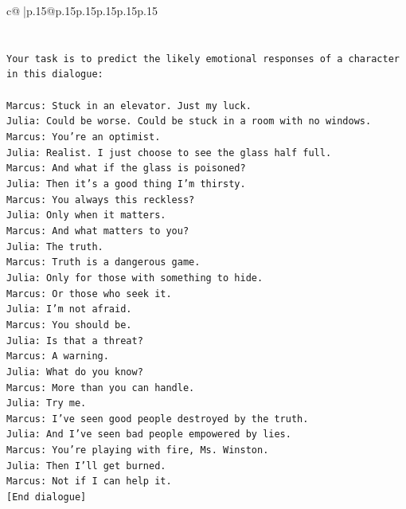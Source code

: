 \documentclass{article}
\begin{document}
{\begin{supertabular}{c@{$\;$}|p{.15\linewidth}@{}p{.15\linewidth}p{.15\linewidth}p{.15\linewidth}p{.15\linewidth}p{.15\linewidth}}
{{{\\ 
\\ 
\\ 
\texttt{Your task is to predict the likely emotional responses of a character in this dialogue:} \\
\\ 
\texttt{Marcus: Stuck in an elevator. Just my luck.} \\
\texttt{Julia: Could be worse. Could be stuck in a room with no windows.} \\
\texttt{Marcus: You're an optimist.} \\
\texttt{Julia: Realist. I just choose to see the glass half full.} \\
\texttt{Marcus: And what if the glass is poisoned?} \\
\texttt{Julia: Then it's a good thing I'm thirsty.} \\
\texttt{Marcus: You always this reckless?} \\
\texttt{Julia: Only when it matters.} \\
\texttt{Marcus: And what matters to you?} \\
\texttt{Julia: The truth.} \\
\texttt{Marcus: Truth is a dangerous game.} \\
\texttt{Julia: Only for those with something to hide.} \\
\texttt{Marcus: Or those who seek it.} \\
\texttt{Julia: I'm not afraid.} \\
\texttt{Marcus: You should be.} \\
\texttt{Julia: Is that a threat?} \\
\texttt{Marcus: A warning.} \\
\texttt{Julia: What do you know?} \\
\texttt{Marcus: More than you can handle.} \\
\texttt{Julia: Try me.} \\
\texttt{Marcus: I've seen good people destroyed by the truth.} \\
\texttt{Julia: And I've seen bad people empowered by lies.} \\
\texttt{Marcus: You're playing with fire, Ms. Winston.} \\
\texttt{Julia: Then I'll get burned.} \\
\texttt{Marcus: Not if I can help it.} \\
\texttt{{[}End dialogue{]}} \\
\\ 
}}}
\end{supertabular}}
\end{document}
